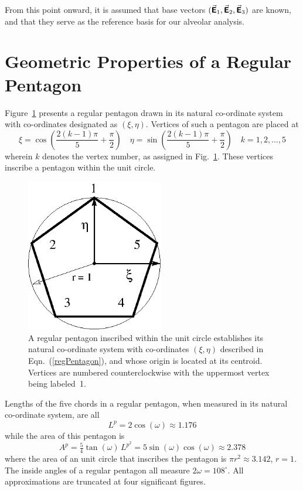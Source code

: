 From this point onward, it is assumed that base vectors $( \vec{\boldsymbol{\mathsf{E}}}_1 , \vec{\boldsymbol{\mathsf{E}}}_2 , \vec{\boldsymbol{\mathsf{E}}}_3 )$ are known, and that they serve as the reference basis for our alveolar analysis.

\section{Geometric Properties of a Regular Pentagon}

Figure~\ref{figRegPentagon} presents a regular pentagon drawn in its natural co-ordinate system with co-ordinates designated as $(\xi, \eta)$.  Vertices of such a pentagon are placed at
\begin{equation}
	\xi = \cos \left( \frac{2(k-1)\pi}{5} + \frac{\pi}{2} \right) \quad
	\eta = \sin \left( \frac{2(k-1)\pi}{5} + \frac{\pi}{2} \right) \quad
	k = 1, 2, \ldots, 5
	\label{regPentagon}
\end{equation}
wherein $k$ denotes the vertex number, as assigned in Fig.~\ref{figRegPentagon}.  These vertices inscribe a pentagon within the unit circle.

\begin{figure}
	\centering
	\includegraphics[width=6cm]{figures/regPentagon.png}
	\caption{A regular pentagon inscribed within the unit circle establishes its natural co-ordinate system with co-ordinates $(\xi, \eta)$ described in Eqn.~(\ref{regPentagon}), and whose origin is located at its centroid.  Vertices are numbered counter\-clockwise with the uppermost vertex being labeled~1.}
	\label{figRegPentagon}
\end{figure}

Lengths of the five chords in a regular pentagon, when measured in its natural co-ordinate system, are all
\begin{equation}
	L^{\!p} = 2 \cos (\omega) \approx 1.176 
	\label{regPentagonLength}
\end{equation}
while the area of this pentagon is
\begin{equation}
	A^p = \tfrac{5}{4} \tan ( \omega ) \, L^{\!p^2} = 
	5 \sin (\omega) \cos (\omega) \approx 2.378
	\label{regPentagonArea}
\end{equation}
where the area of an unit circle that inscribes the pentagon is $\pi r^2 \approx 3.142$, $r=1$.  The inside angles of a regular pentagon all measure $2\omega = 108^{\circ}$.  All approximations are truncated at four significant figures.

